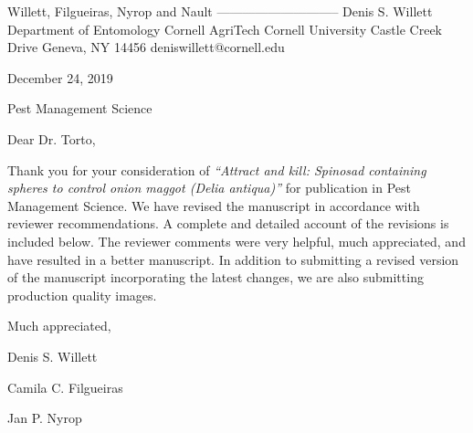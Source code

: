 \documentclass{article}
\begin{document}
\begin{addmargin}[3.8in]{}
Willett, Filgueiras, \newline
Nyrop and Nault \newline
----------------------------- \newline
Denis S. Willett\newline
Department of Entomology \newline
Cornell AgriTech  \newline
Cornell University  Castle Creek Drive \newline
Geneva, NY 14456 \newline
deniswillett@cornell.edu \newline
\end{addmargin}
\setlength{\parindent}{0cm}

December 24, 2019

\vspace{1.24em}

Pest Management Science

\vspace{1.24em}

Dear Dr. Torto,

\vspace{0.48em}
\setlength{\parindent}{1.24cm}

Thank you for your consideration of \textit{“Attract and kill: Spinosad containing spheres to control onion maggot (\textit{Delia antiqua})”} for publication in Pest Management Science.  We have revised the manuscript in accordance with reviewer recommendations.  A complete and detailed account of the revisions is included below.  The reviewer comments were very helpful, much appreciated, and have resulted in a better manuscript.  In addition to submitting a revised version of the manuscript incorporating the latest changes, we are also submitting production quality images.  
  

\vspace{2em}

Much appreciated, \newline

\vspace{1em}

Denis S. Willett
\vspace{0.48em}

Camila C. Filgueiras
\vspace{0.48em}

Jan P. Nyrop
\vspace{0.48em}
\end{document}

